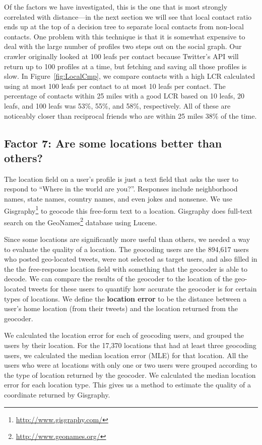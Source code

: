 \documentclass[letterpaper]{article}
\begin{document}
Of the factors we have investigated, this is the one that is most strongly
correlated with distance---in the next section we will see that local contact
ratio ends up at the top of a decision tree to separate local contacts from
non-local contacts.
%
One problem with this technique is that it is somewhat expensive to deal with
the large number of profiles two steps out on the social graph.
%
Our crawler originally looked at 100 leafs per contact because Twitter's API
will return up to 100 profiles at a time, but fetching and saving all those
profiles is slow.
%
In Figure~\ref{fig:LocalCmp}, we compare contacts with a high LCR calculated
using at most 100 leafs per contact to at most 10 leafs per contact.
%
The percentage of contacts within 25 miles with a good LCR based on 10 leafs,
20 leafs, and 100 leafs was 53\%, 55\%, and 58\%, respectively.
%
All of these are noticeably closer than reciprocal friends who are within 25
miles 38\% of the time.


\subsection{Factor 7: Are some locations better than others?}
The location field on a user's profile is just a text field that asks the user
to respond to ``Where in the world are you?''.
%
Responses include neighborhood names, state names, country names, and even
jokes and nonsense.
%
We use Gisgraphy\footnote{\url{http://www.gisgraphy.com/}} to geocode this
free-form text to a location.
%
Gisgraphy does full-text search on the
GeoNames\footnote{\url{http://www.geonames.org/}} database using Lucene.

Since some locations are significantly more useful than others, we needed a way
to evaluate the quality of a location.
%
The geocoding users are the 894,617 users who posted geo-located tweets, were not
selected as target users, and also filled in the the free-response location
field with something that the geocoder is able to decode.
%
We can compare the results of the geocoder to the location of the geo-located
tweets for these users to quantify how accurate the geocoder is for certain
types of locations.
%
We define the \textbf{location error} to be the distance between a user's home
location (from their tweets) and the location returned from the geocoder.

We calculated the location error for each of geocoding users, and grouped the
users by their location.
%
For the 17,370 locations that had at least three geocoding users, we calculated
the median location error (MLE) for that location.
%
All the users who were at locations with only one or two users were grouped
according to the type of location returned by the geocoder.
%
We calculated the median location error for each location type.
%
%
%
This gives us a method to estimate the quality of a coordinate returned by
Gisgraphy.
\end{document}
